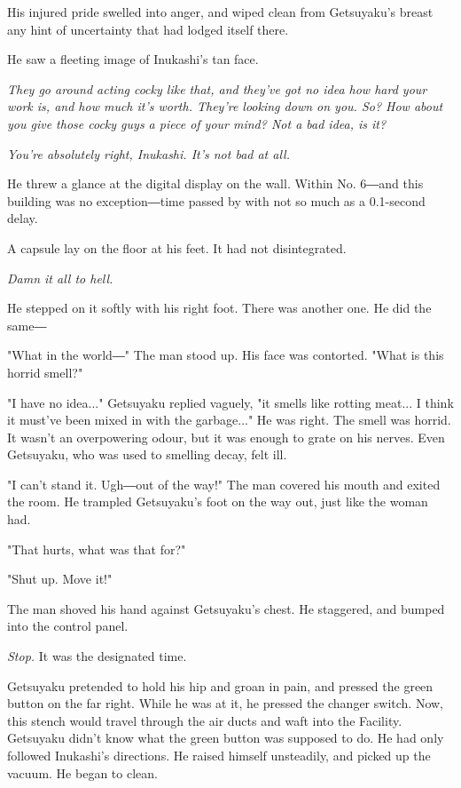 His injured pride swelled into anger, and wiped clean from Getsuyaku's
breast any hint of uncertainty that had lodged itself there.

He saw a fleeting image of Inukashi's tan face.

\emph{They go around acting cocky like that, and they've got no idea how hard
your work is, and how much it's worth. They're looking down on you. So?
How about you give those cocky guys a piece of your mind? Not a bad
idea, is it?}

\emph{You're absolutely right, Inukashi. It's not bad at all.}

He threw a glance at the digital display on the wall. Within No. 6―and
this building was no exception―time passed by with not so much as a
0.1-second delay.

A capsule lay on the floor at his feet. It had not disintegrated.

\emph{Damn it all to hell.}

He stepped on it softly with his right foot. There was another one. He
did the same―

"What in the world―" The man stood up. His face was contorted. "What is
this horrid smell?"

"I have no idea..." Getsuyaku replied vaguely, "it smells like rotting
meat... I think it must've been mixed in with the garbage..." He was
right. The smell was horrid. It wasn't an overpowering odour, but it was
enough to grate on his nerves. Even Getsuyaku, who was used to smelling
decay, felt ill.

"I can't stand it. Ugh―out of the way!" The man covered his mouth and
exited the room. He trampled Getsuyaku's foot on the way out, just like
the woman had.

"That hurts, what was that for?"

"Shut up. Move it!"

The man shoved his hand against Getsuyaku's chest. He staggered, and
bumped into the control panel.

\emph{Stop.} It was the designated time.

Getsuyaku pretended to hold his hip and groan in pain, and pressed the
green button on the far right. While he was at it, he pressed the
changer switch. Now, this stench would travel through the air ducts and
waft into the Facility. Getsuyaku didn't know what the green button was
supposed to do. He had only followed Inukashi's directions. He raised
himself unsteadily, and picked up the vacuum. He began to clean.

